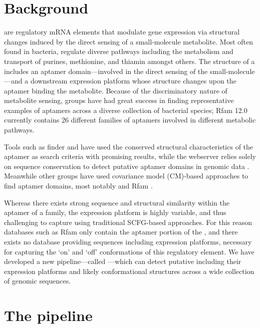 \section{Background}
\label{sec:rfinder:bkgrnd}

\Rbs are regulatory mRNA elements that modulate gene expression via
structural changes induced by the direct sensing of a small-molecule metabolite.
Most often found in bacteria, \rbs regulate diverse pathways including the
metabolism and transport of purines, methionine, and thiamin amongst others. The
structure of a \rb includes an aptamer domain---involved in the direct
sensing of the small-molecule---and a downstream expression platform whose
structure changes upon the aptamer binding the metabolite. Because of the
discriminatory nature of metabolite sensing, groups have had great success in
finding representative examples of aptamers across a diverse collection of
bacterial species; Rfam 12.0 currently contains 26 different families of aptamers
involved in different metabolic pathways.

Tools such as \Rb finder \citep{bengert2004} and 
\citep{chang:2009de} have used the conserved
structural characteristics of the aptamer as search criteria with promising
results, while the webserver  relies solely on sequence conservation
to detect putative aptamer domains in genomic data \citep{abreugoodger:2005hb}.
Meanwhile other groups have used covariance model (CM)-based approaches to find
aptamer domains, most notably  \citep{yao2006} and Rfam
\citep{nawrocki:2014uy}.

Whereas there exists strong sequence and
structural similarity within the aptamer of a \rb family, the expression
platform is highly variable, and thus challenging to capture using traditional
SCFG-based approaches. For this reason databases such as Rfam only contain the aptamer
portion of the \rb, and there exists no database providing sequences
including expression platforms, necessary for capturing the `on' and `off'
conformations of this regulatory element. We have developed a new
pipeline---called \rfinder---which can detect putative \rbs including their
expression platforms and likely conformational structures across a wide collection
of genomic sequences.

\section{The \rfinder pipeline}
\label{sec:rfinder:pipeline}

